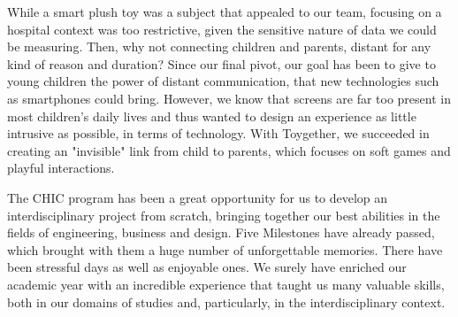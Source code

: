 
While a smart plush toy was a subject that appealed to our team, focusing on a hospital context was too restrictive, given the sensitive nature of data we could be measuring. Then, why not connecting children and parents, distant for any kind of reason and duration? Since our final pivot, our goal has been to give to young children the power of distant communication, that new technologies such as smartphones could bring. However, we know that screens are far too present in most children's daily lives and thus wanted to design an experience as little intrusive as possible, in terms of technology. With Toygether, we succeeded in creating an "invisible" link from child to parents, which focuses on soft games and playful interactions.

\medskip The CHIC program has been a great opportunity for us to develop an interdisciplinary project from scratch, bringing together our best abilities in the fields of engineering, business and design. Five Milestones have already passed, which brought with them a huge number of unforgettable memories. There have been stressful days as well as enjoyable ones. We surely have enriched our academic year with an incredible experience that taught us many valuable skills, both in our domains of studies and, particularly, in the interdisciplinary context. %


